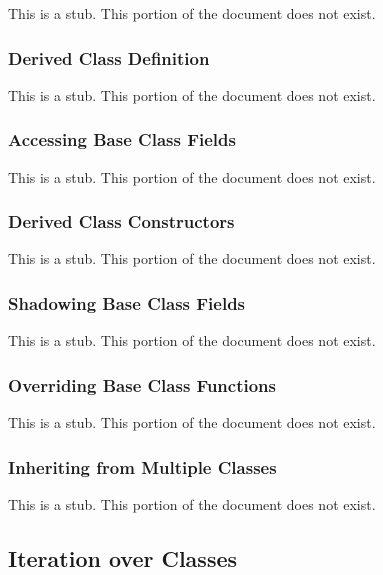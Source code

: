 This is a stub.  This portion of the document does not exist.

\subsubsection{Derived Class Definition}
\label{Derived_Class_Definition}

This is a stub.  This portion of the document does not exist.

\subsubsection{Accessing Base Class Fields}
\label{Accessing_Base_Class_Fields}

This is a stub.  This portion of the document does not exist.

\subsubsection{Derived Class Constructors}
\label{Derived_Class_Constructors}

This is a stub.  This portion of the document does not exist.

\subsubsection{Shadowing Base Class Fields}
\label{Shadowing_Base_Class_Fields}

This is a stub.  This portion of the document does not exist.

\subsubsection{Overriding Base Class Functions}
\label{Overriding_Base_Class_Functions}

This is a stub.  This portion of the document does not exist.

\subsubsection{Inheriting from Multiple Classes}
\label{Inheriting_from_Multiple_Classes}

This is a stub.  This portion of the document does not exist.

\subsection{Iteration over Classes}
\label{Iteration_over_Classes}

